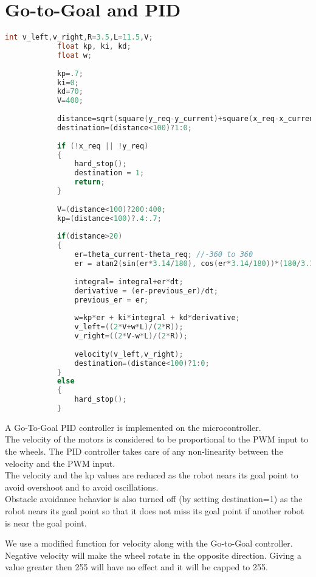 \documentclass[main.tex]{subfiles}
\begin{document}
	\section{Go-to-Goal and PID}
		\begin{lstlisting}[language=C, caption = PID controller]
			int v_left,v_right,R=3.5,L=11.5,V;
			float kp, ki, kd;
			float w;
			
			kp=.7;
			ki=0;
			kd=70;
			V=400;
		
			distance=sqrt(square(y_req-y_current)+square(x_req-x_current));
			destination=(distance<100)?1:0;
			
			if (!x_req || !y_req)
			{
				hard_stop();
				destination = 1;
				return;
			}
			
			V=(distance<100)?200:400;
			kp=(distance<100)?.4:.7;
			
			if(distance>20)
			{
				er=theta_current-theta_req; //-360 to 360
				er = atan2(sin(er*3.14/180), cos(er*3.14/180))*(180/3.14); //-180 to 180
				
				integral= integral+er*dt;
				derivative = (er-previous_er)/dt;
				previous_er = er;
				
				w=kp*er + ki*integral + kd*derivative;
				v_left=((2*V+w*L)/(2*R));
				v_right=((2*V-w*L)/(2*R));
				
				velocity(v_left,v_right);
				destination=(distance<100)?1:0;
			}		
			else
			{
				hard_stop();
			}
		\end{lstlisting}
		A Go-To-Goal PID controller is implemented on the microcontroller.\\
		The velocity of the motors is considered to be proportional to the PWM input to the wheels. The PID controller takes care of any non-linearity between the velocity and the PWM input.\\
		The velocity and the kp values are reduced as the robot nears its goal point to avoid overshoot and to avoid oscillations.\\
		Obstacle avoidance behavior is also turned off (by setting destination=1) as the robot nears its goal point so that it does not miss its goal point if another robot is near the goal point.
		
		\pagebreak
		We use a modified function for velocity along with the Go-to-Goal controller. Negative velocity will make the wheel rotate in the opposite direction. Giving a value greater then 255 will have no effect and it will be capped to 255.
		
\end{document}
